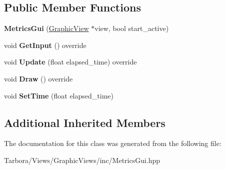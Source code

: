 \subsection*{Public Member Functions}
\begin{DoxyCompactItemize}
\item 
\mbox{\label{classTarbora_1_1MetricsGui_ac765e76dddb13b5caa1fb0037467ee45}} 
{\bfseries Metrics\+Gui} (\hyperlink{classTarbora_1_1GraphicView}{Graphic\+View} $\ast$view, bool start\+\_\+active)
\item 
\mbox{\label{classTarbora_1_1MetricsGui_ad6a6876d813c1e21bfc97650f231c31c}} 
void {\bfseries Get\+Input} () override
\item 
\mbox{\label{classTarbora_1_1MetricsGui_a71334b518e12a241695254e9730cb80c}} 
void {\bfseries Update} (float elapsed\+\_\+time) override
\item 
\mbox{\label{classTarbora_1_1MetricsGui_a0e5d4cdc94adc28092c3ead54a9269aa}} 
void {\bfseries Draw} () override
\item 
\mbox{\label{classTarbora_1_1MetricsGui_a0d223b951f0f9086d4cda21a5b45bd3d}} 
void {\bfseries Set\+Time} (float elapsed\+\_\+time)
\end{DoxyCompactItemize}
\subsection*{Additional Inherited Members}


The documentation for this class was generated from the following file\+:\begin{DoxyCompactItemize}
\item 
Tarbora/\+Views/\+Graphic\+Views/inc/Metrics\+Gui.\+hpp\end{DoxyCompactItemize}

